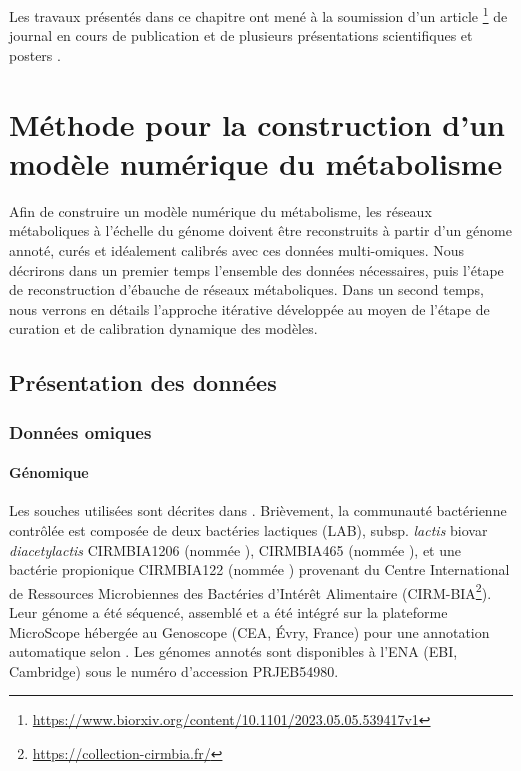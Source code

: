 Les travaux présentés dans ce chapitre ont mené à la soumission d'un article \footnote{\url{https://www.biorxiv.org/content/10.1101/2023.05.05.539417v1}} de journal \citep{Lecomte2023} en cours de publication et de plusieurs présentations scientifiques et posters .


\section{Méthode pour la construction d'un modèle numérique du métabolisme}
Afin de construire un modèle numérique du métabolisme, les réseaux métaboliques à l'échelle du génome doivent être reconstruits à partir d'un génome annoté, curés et idéalement calibrés avec ces données multi-omiques. Nous décrirons dans un premier temps l'ensemble des données nécessaires, puis l'étape de reconstruction d'ébauche de réseaux métaboliques. Dans un second temps, nous verrons en détails l'approche itérative développée au moyen de l'étape de curation et de calibration dynamique des modèles.

\subsection{Présentation des données}

\subsubsection{Données omiques}

\paragraph*{Génomique}
Les souches utilisées sont décrites dans \citep{Cao2021}. Brièvement, la communauté bactérienne contrôlée est composée de deux bactéries lactiques (LAB), \lactis subsp. \textit{lactis} biovar \textit{diacetylactis} CIRMBIA1206 (nommée \lactis), \plantarum CIRMBIA465 (nommée \plantarum), et une bactérie propionique \freud CIRMBIA122 (nommée \freud) provenant du Centre International de Ressources Microbiennes des Bactéries d'Intérêt Alimentaire (CIRM-BIA\footnote{\href{https://collection-cirmbia.fr/}{https://collection-cirmbia.fr/}}). Leur génome a été séquencé, assemblé et a été intégré sur la plateforme MicroScope hébergée au Genoscope (CEA, Évry, France) pour une annotation automatique selon \citep{Vallenet.2019}. Les génomes annotés sont disponibles à l'ENA (EBI, Cambridge) sous le numéro d'accession PRJEB54980.


